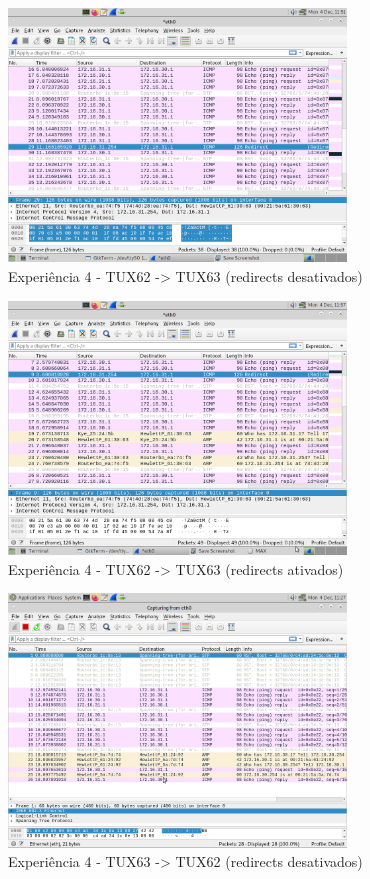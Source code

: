 \documentclass[11pt,a4paper]{article}
\begin{document}
\begin{figure}[H]
    \centering
    \includegraphics[width=0.8\textwidth]{images/experiencia4-ping2-3-redirect.png}
    \caption{Experiência 4 - TUX62 -> TUX63 (redirects desativados)}
\end{figure}

\begin{figure}[H]
    \centering
    \includegraphics[width=0.8\textwidth]{images/experiencia4-ping2-3-w_redirect.png}
    \caption{Experiência 4 - TUX62 -> TUX63 (redirects ativados)}
\end{figure}

\begin{figure}[H]
    \centering
    \includegraphics[width=0.8\textwidth]{images/experiencia4-ping3-2.png}
    \caption{Experiência 4 - TUX63 -> TUX62 (redirects desativados)}
\end{figure}
\end{document}

